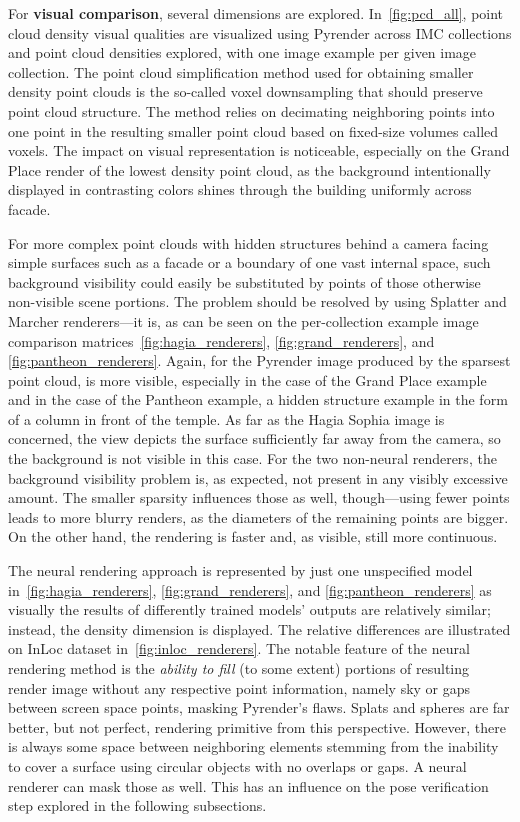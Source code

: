 For \textbf{visual comparison}, several dimensions are explored.
In~\cref{fig:pcd_all}, point cloud density visual qualities are
visualized using Pyrender across IMC collections and point cloud
densities explored, with one image example per given image collection.
The point cloud simplification method used for obtaining smaller density
point clouds is the so-called voxel downsampling that should preserve point
cloud structure. The method relies on decimating neighboring points into
one point in the resulting smaller point cloud based on fixed-size volumes called
voxels. The impact on visual representation is noticeable, especially
on the Grand Place render of the lowest density point cloud, as the background
intentionally displayed in contrasting colors shines through the
building uniformly across facade.

For more complex point clouds with hidden structures behind a camera
facing simple surfaces such as a facade or a boundary of one vast
internal space, such background visibility could easily be substituted by
points of those otherwise non-visible scene portions. The
problem should be resolved by using Splatter and Marcher renderers---it
is, as can be seen on the per-collection example image comparison
matrices~\cref{fig:hagia_renderers}, \cref{fig:grand_renderers}, and
\cref{fig:pantheon_renderers}. Again, for the Pyrender image produced by
the sparsest point cloud,  is more visible, especially
in the case of the Grand Place example and in the case of the Pantheon
example, a hidden structure example in the form of a column in front of
the temple. As far as the Hagia Sophia image is concerned, the view depicts
the surface sufficiently far away from the camera, so the background is
not visible in this case. For the two non-neural renderers, the background
visibility problem is, as expected, not present in any visibly excessive
amount. The smaller sparsity influences those as well, though---using
fewer points leads to more blurry renders, as the diameters of the
remaining points are bigger. On the other hand, the rendering is faster
and, as visible, still more continuous.

The neural rendering approach is represented by just one unspecified
model in~\cref{fig:hagia_renderers}, \cref{fig:grand_renderers}, and
\cref{fig:pantheon_renderers} as visually the results of differently
trained models' outputs are relatively similar; instead, the density
dimension is displayed. The relative differences are illustrated on InLoc
dataset in~\cref{fig:inloc_renderers}. The notable feature of the
neural rendering method is the \emph{ability to fill} (to some extent)
portions of resulting render image without any respective point
information, namely sky or gaps between screen space points, masking
Pyrender's flaws. Splats and spheres are far better, but not perfect,
rendering primitive from this perspective. However, there is always
some space between neighboring elements stemming from the inability
to cover a surface using circular objects with no overlaps or gaps.
A neural renderer can mask those as well. This has an influence on
the pose verification step explored in the following subsections.

